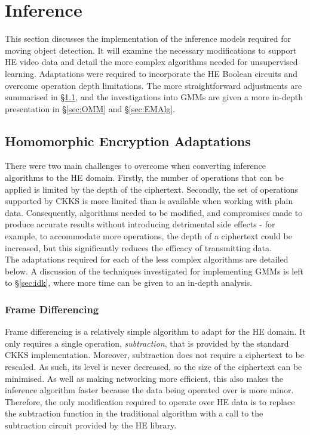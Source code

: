 \setlength{\leftskip}{0cm}




\section{Inference}
\setlength{\leftskip}{0.25cm}
\indent \indent
This section discusses the implementation of the inference models required for moving object detection. It will examine the necessary modifications to support HE video data and detail the more complex algorithms needed for unsupervised learning. Adaptations were required to incorporate the HE Boolean circuits and overcome operation depth limitations. The more straightforward adjustments are summarised in §\ref{sec:adaptations}, and the investigations into GMMs are given a more in-depth presentation in §\ref{sec:OMM} and §\ref{sec:EMAlg}.

\setlength{\leftskip}{0cm}
\subsection{Homomorphic Encryption Adaptations}
\label{sec:adaptations}
\setlength{\leftskip}{0.5cm}
\indent \indent
There were two main challenges to overcome when converting inference algorithms to the HE domain. Firstly, the number of operations that can be applied is limited by the depth of the ciphertext. Secondly, the set of operations supported by CKKS is more limited than is available when working with plain data. Consequently, algorithms needed to be modified, and compromises made to produce accurate results without introducing detrimental side effects - for example, to accommodate more operations, the depth of a ciphertext could be increased, but this significantly reduces the efficacy of transmitting data.
\smallskip \\ \indent
The adaptations required for each of the less complex algorithms are detailed below. A discussion of the techniques investigated for implementing GMMs is left to §\ref{sec:idk}, where more time can be given to an in-depth analysis.

\setlength{\leftskip}{0cm}
\subsubsection{Frame Differencing}
\setlength{\leftskip}{0.5cm}
\indent \indent
Frame differencing is a relatively simple algorithm to adapt for the HE domain. It only requires a single operation, \textit{subtraction}, that is provided by the standard CKKS implementation. Moreover, subtraction does not require a ciphertext to be rescaled. As such, its level is never decreased, so the size of the ciphertext can be minimised. As well as making networking more efficient, this also makes the inference algorithm faster because the data being operated over is more minor.
\smallskip \\ \indent
Therefore, the only modification required to operate over HE data is to replace the subtraction function in the traditional algorithm with a call to the subtraction circuit provided by the HE library.


